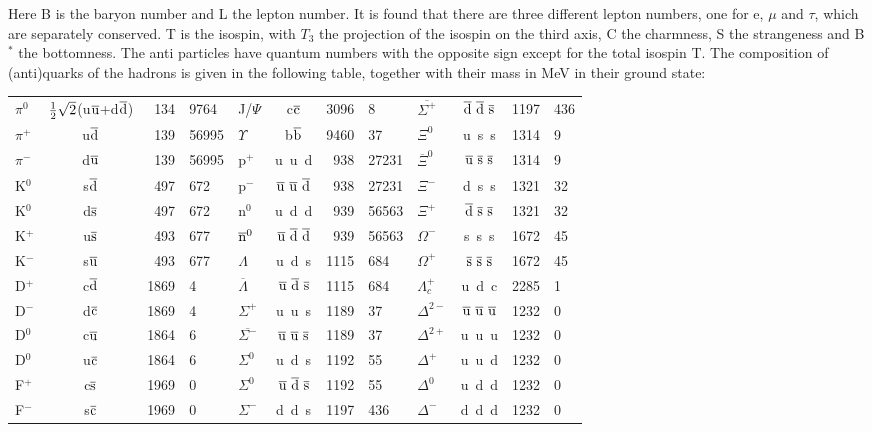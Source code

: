Here B is the baryon number and L the lepton number. It is found that there
are three different lepton numbers, one for e, $\mu$ and $\tau$, which are
separately conserved. T is the isospin, with $T_3$ the projection of the
isospin on the third axis, C the charmness, S the strangeness and B$^*$ the
bottomness. The anti particles have quantum numbers with the opposite sign
except for the total isospin T. The composition of (anti)quarks of the
hadrons is given in the following table, together with their mass in MeV in
their ground state:
\begin{center}
\begin{tabular}{||l|cr@{.}l||l|cr@{.}l||l|cr@{.}l||}
\hline
$\pi^0$&$\mbox{$\frac{1}{2}$}\sqrt{2}$(u$\overline{\rm u}$+d$\overline{\rm d}$)&134&9764&J/$\Psi$&c$\overline{\rm c}$&3096&8&$\overline{\Sigma^+}$&$\overline{\rm d}~\overline{\rm d}~\overline{\rm s}$&1197&436\rule{0pt}{15pt}\\
$\pi^+$&u$\overline{\rm d}$&139&56995&$\Upsilon$&b$\overline{\rm b}$&9460&37 &$\Xi^0$&u~s~s&1314&9\\
\cline{5-8}
$\pi^-$&d$\overline{\rm u}$&139&56995&p$^+$&u~u~d&938&27231&$\overline{\Xi}^0$&$\overline{\rm u}~\overline{\rm s}~\overline{\rm s}$&1314&9\\
K$^0$&s$\overline{\rm d}$&497&672&p$^-$&$\overline{\rm u}~\overline{\rm u}~\overline{\rm d}$&938&27231&$\Xi^-$&d~s~s&1321&32\\
K$^0$&d$\overline{\rm s}$&497&672&n$^0$&u~d~d&939&56563&$\Xi^+$&$\overline{\rm d}~\overline{\rm s}~\overline{\rm s}$&1321&32\\
K$^+$&u$\overline{\rm s}$&493&677&$\overline{\rm n}^0$&$\overline{\rm u}~\overline{\rm d}~\overline{\rm d}$&939&56563&$\Omega^-$&s~s~s&1672&45\\
K$^-$&s$\overline{\rm u}$&493&677&$\Lambda$&u~d~s&1115&684&$\Omega^+$&$\overline{\rm s}~\overline{\rm s}~\overline{\rm s}$&1672&45\\
D$^+$&c$\overline{\rm d}$&1869&4&$\overline{\Lambda}$&$\overline{\rm u}~\overline{\rm d}~\overline{\rm s}$&1115&684&$\Lambda_c^+$&u~d~c&2285&1\\
D$^-$&d$\overline{\rm c}$&1869&4&$\Sigma^+$&u~u~s&1189&37&$\Delta^{2-}$&$\overline{\rm u}~\overline{\rm u}~\overline{\rm u}$&1232&0\\
D$^0$&c$\overline{\rm u}$&1864&6&$\overline{\Sigma^-}$&$\overline{\rm u}~\overline{\rm u}~\overline{\rm s}$&1189&37&$\Delta^{2+}$&u~u~u&1232&0\\
D$^0$&u$\overline{\rm c}$&1864&6&$\Sigma^0$&u~d~s&1192&55&$\Delta^+$&u~u~d&1232&0\\
F$^+$&c$\overline{\rm s}$&1969&0&$\Sigma^0$&$\overline{\rm u}~\overline{\rm d}~\overline{\rm s}$&1192&55&$\Delta^0$&u~d~d&1232&0\\
F$^-$&s$\overline{\rm c}$&1969&0&$\Sigma^-$&d~d~s&1197&436&$\Delta^-$&d~d~d&1232&0\\
\hline
\end{tabular}
\end{center}
